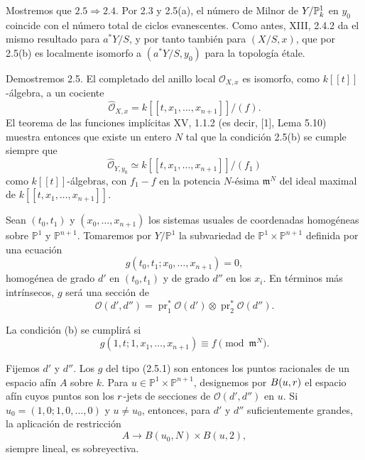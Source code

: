 Mostremos que $2.5\Rightarrow2.4$. Por 2.3 y 2.5(a), el número de
Milnor de $\sisi{Y/T}{Y/\mathbb P^1_k}$ en $y_0$ coincide con el
número total de ciclos evanescentes. Como antes, XIII, 2.4.2 da el
mismo resultado para $a^*Y/S$, y por tanto también para $(X/S,x)$,
que por 2.5(b) es localmente isomorfo a $(a^*Y/S,y_0)$ para la
topología étale.

Demostremos 2.5. El completado del anillo local $\mathcal O_{X,x}$ es
isomorfo, como $k[[t]]$-álgebra, a un cociente
\[
\widehat{\mathcal O}_{X,x}
=k[[t,x_1,\ldots,x_{n+1}]]/(f).
\]
El teorema de las funciones implícitas XV, 1.1.2 (es decir, [1],
Lema 5.10) muestra entonces que existe un entero $N$ tal que la
condición 2.5(b) se cumple siempre que
\[
\widehat{\mathcal O}_{Y,y_0}
\simeq k[[t,x_1,\ldots,x_{n+1}]]/(f_1)
\]
como $k[[t]]$-álgebras, con $f_1-f$ en la potencia $N$-ésima
$\mathfrak m^N$ del ideal maximal de
$k[[t,x_1,\ldots,x_{n+1}]]$.

Sean $(t_0,t_1)$ y $(x_0,\ldots,x_{n+1})$ los sistemas usuales de
coordenadas homogéneas sobre $\mathbb P^1$ y $\mathbb P^{n+1}$.
Tomaremos por $Y/\mathbb P^1$ la subvariedad de
$\mathbb P^1\times\mathbb P^{n+1}$ definida por una ecuación
\begin{equation}\tag{2.5.1}
g(t_0,t_1;x_0,\ldots,x_{n+1})=0,
\end{equation}
homogénea de grado $d'$ en $(t_0,t_1)$ y de grado $d''$ en los
$x_i$. En términos más intrínsecos, $g$ será una sección de
\[
\mathcal O(d',d'')=\operatorname{pr}_1^*\mathcal O(d')
\otimes\operatorname{pr}_2^*\mathcal O(d'').
\]

\pageoriginale

La condición (b) se cumplirá si
\begin{equation}\tag{2.5.2}
g(1,t;1,x_1,\ldots,x_{n+1})\equiv f\pmod{\mathfrak m^N}.
\end{equation}

Fijemos $d'$ y $d''$. Los $g$ del tipo (2.5.1) son entonces los puntos
racionales de un espacio afín $A$ sobre $k$. Para
$u\in\mathbb P^1\times\mathbb P^{n+1}$, designemos por
$B(u,\sisi{k}{r})$ el espacio afín cuyos puntos son los
$\sisi{k}{r}$-jets de secciones de $\mathcal O(d',d'')$ en $u$.
Si $u_0=(1,0;1,0,\ldots,0)$ y $u\ne u_0$, entonces, para $d'$ y
$d''$ suficientemente grandes, la aplicación de restricción
\begin{equation}\tag{2.5.3}
A\longrightarrow B(u_0,N)\times B(u,2),
\end{equation}
siempre lineal, es sobreyectiva.

